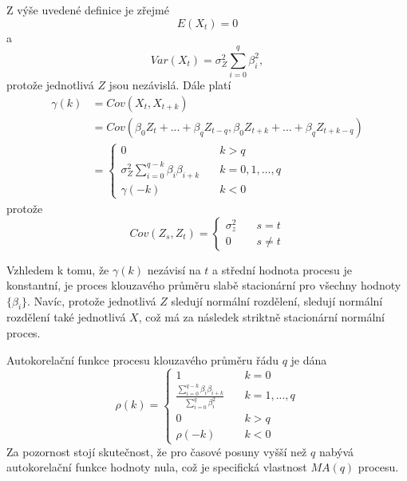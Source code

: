 Z výše uvedené definice je zřejmé
\begin{equation}
E(X_t) = 0
\end{equation}
a
\begin{equation}
Var(X_t) = \sigma^2_Z \sum_{i = 0}^q \beta_i^2,
\end{equation}
protože jednotlivá $Z$ jsou nezávislá. Dále platí
\begin{equation}
\begin{split}
\gamma(k) & = Cov(X_t, X_{t + k})\\
 & = Cov(\beta_0 Z_t + ... + \beta_q Z_{t - q}, \beta_0 Z_{t + k} + ... + \beta_q Z_{t + k - q})\\
 & =
 \begin{cases}
 0 & \quad k > q\\
 \sigma^2_Z \sum_{i = 0}^{q - k} \beta_i \beta_{i + k} & \quad k = 0, 1, ..., q\\
 \gamma(-k) & \quad k < 0
 \end{cases}
\end{split}
\end{equation}
protože
\begin{equation}
Cov(Z_s, Z_t) = 
\begin{cases}
\sigma^2_z & \quad s = t\\
0 & \quad s \ne t
\end{cases}
\end{equation}

Vzhledem k tomu, že $\gamma(k)$  nezávisí na $t$ a střední hodnota procesu je konstantní, je proces klouzavého průměru slabě stacionární pro všechny hodnoty $\{\beta_i\}$. Navíc, protože jednotlivá $Z$ sledují normální rozdělení, sledují normální rozdělení také jednotlivá $X$, což má za následek striktně stacionární normální proces.

Autokorelační funkce procesu klouzavého průměru řádu $q$ je dána
\begin{equation}
\rho(k) =
\begin{cases}
1 & \quad k = 0\\
\frac{\sum_{i = 0}^{q-k} \beta_i \beta_{i + k}}{\sum_{i = 0}^q \beta_i^2} & \quad k = 1, ..., q\\
0 & \quad k > q\\
\rho(-k) & \quad k < 0
\end{cases}
\end{equation}
Za pozornost stojí skutečnost, že pro časové posuny vyšší než $q$ nabývá autokorelační funkce hodnoty nula, což je specifická vlastnost $MA(q)$ procesu.

